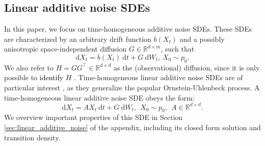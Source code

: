 \documentclass[twoside,11pt]{article}
\newcommand{\R} {\mathbb R}
\newcommand{\rv}[1]{\textcolor{black}{#1}}
\begin{document}
\subsection{Linear additive noise SDEs}
In this paper, we focus on time-homogeneous additive noise SDEs. These SDEs are characterized by an arbitrary drift function $b(X_t)$ and a possibly anisotropic space-independent diffusion $G \in \mathbb{R}^{d \times m}$, such that 
\begin{equation}
    \mathrm{d}X_t = b(X_t) \:\mathrm{d}t+ G\: \mathrm{d}W_t, \  X_0 \sim p_0.
    \label{eq: additive_noise_SDE}
\end{equation}
We also refer to $H = GG^\top \in \R^{d \times d}$ as the (observational) diffusion, since it is only possible to \rv{identify} $H$ \citep{wang2024generator, pavliotis2014stochastic}. Time-homogeneous linear additive noise SDEs are of particular interest \citep{du2023dynamical, wang2024generator, zhang2024joint}, as they generalize the popular Ornstein-Uhlenbeck process. A time-homogeneous linear additive noise SDE obeys the form:
\begin{equation}
    \mathrm{d}X_t = AX_t \: \mathrm{d}t+ G\:\mathrm{d}W_t, \ \ X_0 \sim p_0, \ \ A \in \R^{d \times d}.
    \label{eq: linear_additive_noise_SDE}
\end{equation}
We overview important properties of this SDE in Section \ref{sec:linear_additive_noise} of the appendix, including its closed form solution and transition density.








\end{document}
